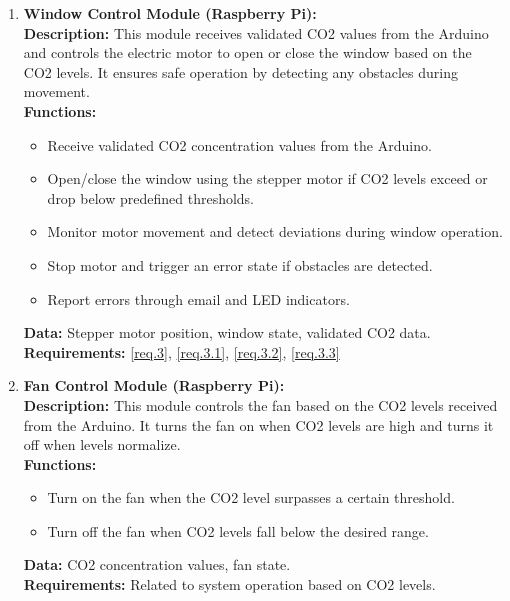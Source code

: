 \begin{enumerate}
    \item \textbf{Window Control Module (Raspberry Pi):} \\ 
        \textbf{Description:} This module receives validated CO2 values from the Arduino and controls the electric motor to open or close the window based on the CO2 levels. It ensures safe operation by detecting any obstacles during movement. \\ 
        \textbf{Functions:}
        \begin{itemize}
            \item Receive validated CO2 concentration values from the Arduino.
            \item Open/close the window using the stepper motor if CO2 levels exceed or drop below predefined thresholds.
            \item Monitor motor movement and detect deviations during window operation.
            \item Stop motor and trigger an error state if obstacles are detected.
            \item Report errors through email and LED indicators.
        \end{itemize}
        \textbf{Data:} Stepper motor position, window state, validated CO2 data. \\ 
        \textbf{Requirements:} \ref{req.3},  \ref{req.3.1}, \ref{req.3.2}, \ref{req.3.3} \\

    \item \textbf{Fan Control Module (Raspberry Pi):} \\ 
        \textbf{Description:} This module controls the fan based on the CO2 levels received from the Arduino. It turns the fan on when CO2 levels are high and turns it off when levels normalize. \\ 
        \textbf{Functions:}
        \begin{itemize}
            \item Turn on the fan when the CO2 level surpasses a certain threshold.
            \item Turn off the fan when CO2 levels fall below the desired range.
        \end{itemize}
        \textbf{Data:} CO2 concentration values, fan state. \\ 
        \textbf{Requirements:} Related to system operation based on CO2 levels.
\end{enumerate}

